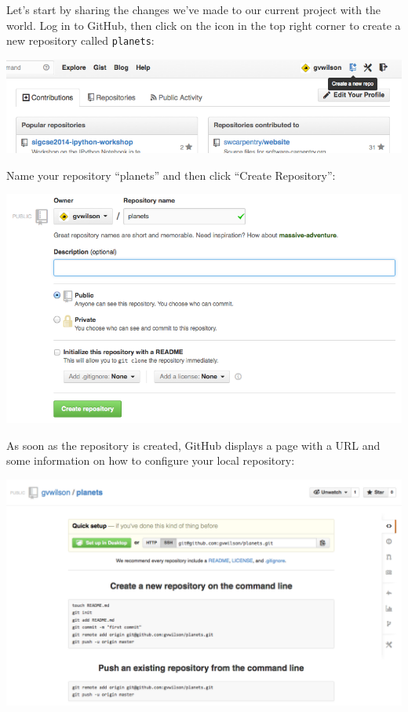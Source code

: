 \documentclass{book}
\begin{document}
Let's start by sharing the changes we've made to our current project
with the world. Log in to GitHub, then click on the icon in the top
right corner to create a new repository called \texttt{planets}:

\includegraphics{novice/git/img/github-create-repo-01.png}

Name your repository ``planets'' and then click ``Create Repository'':

\includegraphics{novice/git/img/github-create-repo-02.png}

As soon as the repository is created, GitHub displays a page with a URL
and some information on how to configure your local repository:

\includegraphics{novice/git/img/github-create-repo-03.png}
\end{document}
